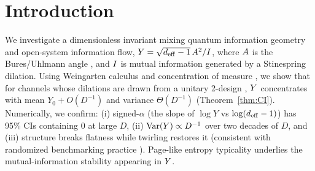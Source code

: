 \section{Introduction}
We investigate a dimensionless invariant mixing quantum information geometry and open-system information flow,
\(Y = \sqrt{d_{\mathrm{eff}}-1}\,A^2/I\), where $A$ is the Bures/Uhlmann angle \cite{uhlmann1976,hubner1994,dittmann1999},
and $I$ is mutual information generated by a Stinespring dilation. Using Weingarten calculus \cite{weingarten}
and concentration of measure \cite{ledoux2001}, we show that for channels whose dilations are drawn from a
unitary 2-design \cite{dankert2009,brandao2016}, $Y$ concentrates with mean $Y_0+O(D^{-1})$ and variance
$\Theta(D^{-1})$ (Theorem~\ref{thm:CI}). Numerically, we confirm: (i) signed-$\alpha$ (the slope of $\log Y$ vs $\log(d_{\mathrm{eff}}-1)$)
has 95\% CIs containing $0$ at large $D$, (ii) $\mathrm{Var}(Y)\propto D^{-1}$ over two decades of $D$, and (iii) structure breaks flatness
while twirling restores it (consistent with randomized benchmarking practice \cite{magesan2012}). Page-like entropy typicality
\cite{page1993,lubkin1978} underlies the mutual-information stability appearing in $Y$.
